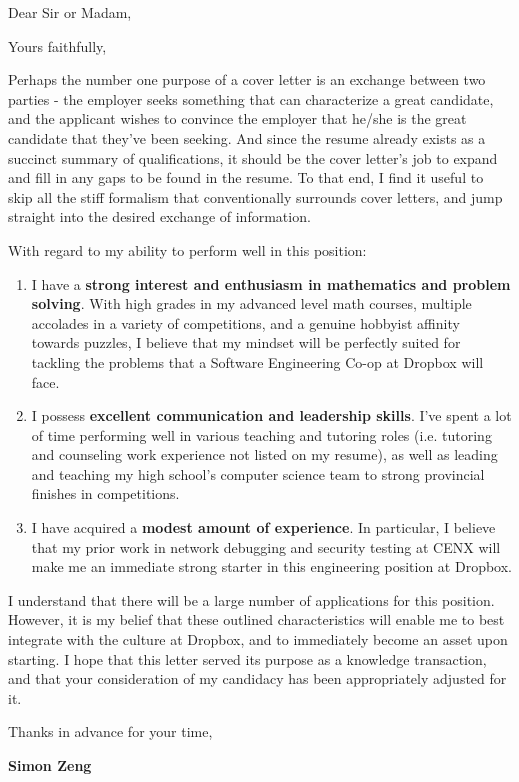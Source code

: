 \documentclass[12pt,a4paper,sans]{moderncv}        %
\begin{document}
\date{January 18, 2019}
\opening{Dear Sir or Madam,}
\closing{Yours faithfully,}
\makelettertitle

Perhaps the number one purpose of a cover letter is an exchange between two 
parties - the employer seeks something that can characterize a great candidate, 
and the applicant wishes to convince the employer that he/she is the great 
candidate that they've been seeking. And since the resume already exists as a 
succinct summary of qualifications, it should be the cover letter's job to 
expand and fill in any gaps to be found in the resume. To that end, I find it 
useful to skip all the stiff formalism that conventionally surrounds cover letters, 
and jump straight into the desired exchange of information.

With regard to my ability to perform well in this position:
\smallskip
\begin{enumerate}
    \item I have a \textbf{strong interest and enthusiasm in mathematics and 
            problem solving}. With high grades in my advanced level math 
        courses, multiple accolades in a variety of competitions, and a genuine 
        hobbyist affinity towards puzzles, I believe that my mindset will be 
        perfectly suited for tackling the problems that a Software Engineering 
        Co-op at Dropbox will face. 
        \smallskip
    \item I possess \textbf{excellent communication and leadership skills}. I've 
        spent a lot of time performing well in various teaching and tutoring 
        roles (i.e. tutoring and counseling work experience not listed on my 
        resume), as well as leading and teaching my high school's computer 
        science team to strong provincial finishes in competitions.
        \smallskip
    \item I have acquired a \textbf{modest amount of experience}. In particular, I 
        believe that my prior work in network debugging and security testing at 
        CENX will make me an immediate strong starter in this engineering position 
        at Dropbox.
\end{enumerate}

I understand that there will be a large number of applications for this 
position. However, it is my belief that these outlined characteristics will 
enable me to best integrate with the culture at Dropbox, and to immediately 
become an asset upon starting. I hope that this letter served its purpose as a 
knowledge transaction, and that your consideration of my candidacy has been 
appropriately adjusted for it.
\smallskip

Thanks in advance for your time,

\textbf{Simon Zeng}

\end{document}
